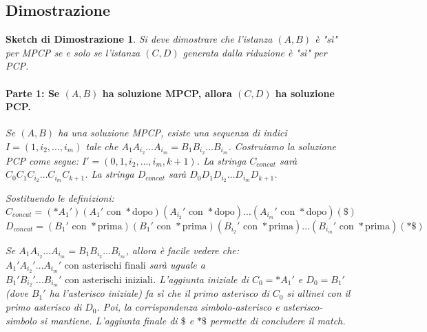 \documentclass[a4paper, 11pt]{book} %
\newtheorem{proof_sketch}[theorem]{Sketch di Dimostrazione}
\theoremstyle{definition}
\begin{document}
\subsection{Dimostrazione}
\begin{proof_sketch}
Si deve dimostrare che l'istanza $(A, B)$ è "sì" per MPCP se e solo se l'istanza $(C, D)$ generata dalla riduzione è "sì" per PCP.

\paragraph{Parte 1: Se $(A, B)$ ha soluzione MPCP, allora $(C, D)$ ha soluzione PCP.}
Se $(A, B)$ ha una soluzione MPCP, esiste una sequenza di indici $I = (1, i_2, \dots, i_m)$ tale che $A_1 A_{i_2} \dots A_{i_m} = B_1 B_{i_2} \dots B_{i_m}$.
Costruiamo la soluzione PCP come segue: $I' = (0, 1, i_2, \dots, i_m, k+1)$.
La stringa $C_{concat}$ sarà $C_0 C_1 C_{i_2} \dots C_{i_m} C_{k+1}$.
La stringa $D_{concat}$ sarà $D_0 D_1 D_{i_2} \dots D_{i_m} D_{k+1}$.

Sostituendo le definizioni:
$C_{concat} = (* A_1') (A_1' \text{ con } * \text{dopo}) (A_{i_2}' \text{ con } * \text{dopo}) \dots (A_{i_m}' \text{ con } * \text{dopo}) (\$)$
$D_{concat} = (B_1' \text{ con } * \text{prima}) (B_1' \text{ con } * \text{prima}) (B_{i_2}' \text{ con } * \text{prima}) \dots (B_{i_m}' \text{ con } * \text{prima}) (*\$)$

Se $A_1 A_{i_2} \dots A_{i_m} = B_1 B_{i_2} \dots B_{i_m}$, allora è facile vedere che:
$A_1' A_{i_2}' \dots A_{i_m}' \text{ con asterischi finali}$
sarà uguale a
$B_1' B_{i_2}' \dots B_{i_m}' \text{ con asterischi iniziali}$.
L'aggiunta iniziale di $C_0 = *A_1'$ e $D_0 = B_1'$ (dove $B_1'$ ha l'asterisco iniziale) fa sì che il primo asterisco di $C_0$ si allinei con il primo asterisco di $D_0$. Poi, la corrispondenza simbolo-asterisco e asterisco-simbolo si mantiene. L'aggiunta finale di $\$$ e $*\$$ permette di concludere il match.


\end{proof_sketch}
\end{document}
